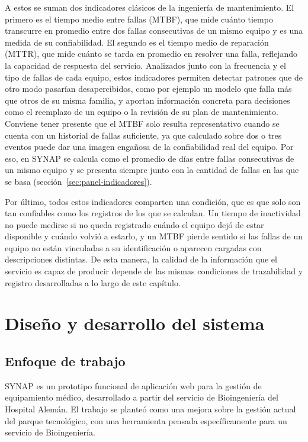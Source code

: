\documentclass[10pt]{article}
\begin{document}
A estos se suman dos indicadores clásicos de la ingeniería de mantenimiento. El primero es el tiempo medio entre fallas (MTBF), que mide cuánto tiempo transcurre en promedio entre dos fallas consecutivas de un mismo equipo y es una medida de su confiabilidad. El segundo es el tiempo medio de reparación (MTTR), que mide cuánto se tarda en promedio en resolver una falla, reflejando la capacidad de respuesta del servicio. Analizados junto con la frecuencia y el tipo de fallas de cada equipo, estos indicadores permiten detectar patrones que de otro modo pasarían desapercibidos, como por ejemplo un modelo que falla más que otros de su misma familia, y aportan información concreta para decisiones como el reemplazo de un equipo o la revisión de su plan de mantenimiento. Conviene tener presente que el MTBF solo resulta representativo cuando se cuenta con un historial de fallas suficiente, ya que calculado sobre dos o tres eventos puede dar una imagen engañosa de la confiabilidad real del equipo. Por eso, en SYNAP se calcula como el promedio de días entre fallas consecutivas de un mismo equipo y se presenta siempre junto con la cantidad de fallas en las que se basa (sección~\ref{sec:panel-indicadores}).

Por último, todos estos indicadores comparten una condición, que es que solo son tan confiables como los registros de los que se calculan. Un tiempo de inactividad no puede medirse si no queda registrado cuándo el equipo dejó de estar disponible y cuándo volvió a estarlo, y un MTBF pierde sentido si las fallas de un equipo no están vinculadas a su identificación o aparecen cargadas con descripciones distintas. De esta manera, la calidad de la información que el servicio es capaz de producir depende de las mismas condiciones de trazabilidad y registro desarrolladas a lo largo de este capítulo.


\newpage
\section{Diseño y desarrollo del sistema}
\label{sec:diseno-desarrollo}

\subsection{Enfoque de trabajo}
\label{sec:enfoque-trabajo}
SYNAP es un prototipo funcional de aplicación web para la gestión de equipamiento médico, desarrollado a partir del servicio de Bioingeniería del Hospital Alemán. El trabajo se planteó como una mejora sobre la gestión actual del parque tecnológico, con una herramienta pensada específicamente para un servicio de Bioingeniería.
\end{document}
